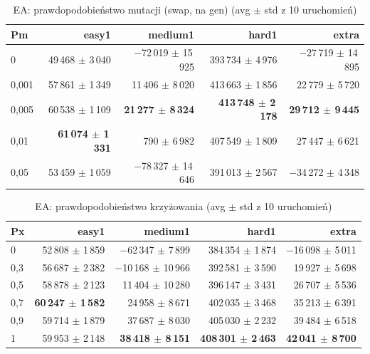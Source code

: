 \begin{table}[H]
  \centering
  \small
  \caption{EA: prawdopodobieństwo mutacji (swap, na gen) (avg $\pm$ std z 10 uruchomień)}
  \label{tab:ea-pm-swap}
  \begin{tabular}{lrrrr}
    \toprule
    Pm & easy1 & medium1 & hard1 & extra \\
    \midrule
    0 & 49\,468 $\pm$ 3\,040 & $-$72\,019 $\pm$ 15\,925 & 393\,734 $\pm$ 4\,976 & $-$27\,719 $\pm$ 14\,895 \\
    0{,}001 & 57\,861 $\pm$ 1\,349 & 11\,406 $\pm$ 8\,020 & 413\,663 $\pm$ 1\,856 & 22\,779 $\pm$ 5\,720 \\
    0{,}005 & 60\,538 $\pm$ 1\,109 & \textbf{21\,277 $\pm$ 8\,324} & \textbf{413\,748 $\pm$ 2\,178} & \textbf{29\,712 $\pm$ 9\,445} \\
    0{,}01 & \textbf{61\,074 $\pm$ 1\,331} & 790 $\pm$ 6\,982 & 407\,549 $\pm$ 1\,809 & 27\,447 $\pm$ 6\,621 \\
    0{,}05 & 53\,459 $\pm$ 1\,059 & $-$78\,327 $\pm$ 14\,646 & 391\,013 $\pm$ 2\,567 & $-$34\,272 $\pm$ 4\,348 \\
    \bottomrule
  \end{tabular}
\end{table}

\begin{table}[H]
  \centering
  \small
  \caption{EA: prawdopodobieństwo krzyżowania (avg $\pm$ std z 10 uruchomień)}
  \label{tab:ea-px}
  \begin{tabular}{lrrrr}
    \toprule
    Px & easy1 & medium1 & hard1 & extra \\
    \midrule
    0 & 52\,808 $\pm$ 1\,859 & $-$62\,347 $\pm$ 7\,899 & 384\,354 $\pm$ 1\,874 & $-$16\,098 $\pm$ 5\,011 \\
    0{,}3 & 56\,687 $\pm$ 2\,382 & $-$10\,168 $\pm$ 10\,966 & 392\,581 $\pm$ 3\,590 & 19\,927 $\pm$ 5\,698 \\
    0{,}5 & 58\,878 $\pm$ 2\,123 & 11\,404 $\pm$ 10\,280 & 396\,147 $\pm$ 3\,431 & 26\,707 $\pm$ 5\,536 \\
    0{,}7 & \textbf{60\,247 $\pm$ 1\,582} & 24\,958 $\pm$ 8\,671 & 402\,035 $\pm$ 3\,468 & 35\,213 $\pm$ 6\,391 \\
    0{,}9 & 59\,714 $\pm$ 1\,879 & 37\,687 $\pm$ 8\,030 & 405\,030 $\pm$ 2\,232 & 39\,484 $\pm$ 6\,518 \\
    1 & 59\,953 $\pm$ 2\,148 & \textbf{38\,418 $\pm$ 8\,151} & \textbf{408\,301 $\pm$ 2\,463} & \textbf{42\,041 $\pm$ 8\,700} \\
    \bottomrule
  \end{tabular}
\end{table}

